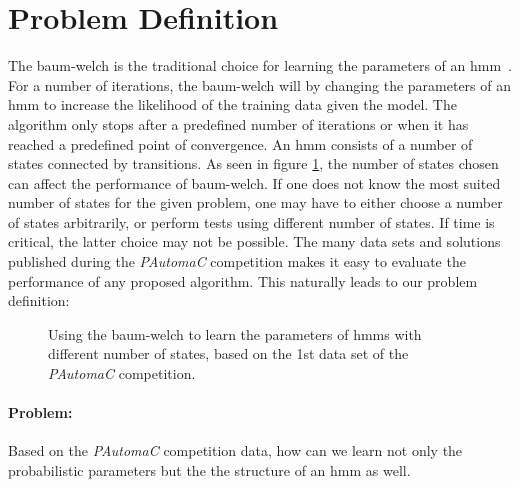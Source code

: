 \section{Problem Definition}

The \gls{baum-welch} is the traditional choice for learning the parameters of an \gls{hmm}~\cite{pautomacTR}. 
For a number of iterations, the \gls{baum-welch} will by changing the parameters of an \gls{hmm} to increase the likelihood of the training data given the model. The algorithm only stops after a predefined number of iterations or when it has reached a predefined point of convergence.
An \gls{hmm} consists of a number of states connected by transitions. As seen in figure \ref{fig:bw-states-are-important}, the number of states chosen can affect the performance of \gls{baum-welch}. If one does not know the most suited number of states for the given problem, one may have to either choose a number of states arbitrarily, or perform tests using different number of states. If time is critical, the latter choice may not be possible.
The many data sets and solutions published during the \emph{PAutomaC} competition makes it easy to evaluate the performance of any proposed algorithm.
This naturally leads to our problem definition:

\begin{figure}
\begin{centering}
\caption{Using the \gls{baum-welch} to learn the parameters of \gls{hmm}s with different number of states, based on the 1st data set of the \emph{PAutomaC} competition.}
\label{fig:bw-states-are-important} 
\end{centering}
\end{figure}


\paragraph{Problem:}
Based on the \emph{PAutomaC} competition data, how can we learn not only the probabilistic parameters but the the structure of an \gls{hmm} as well.